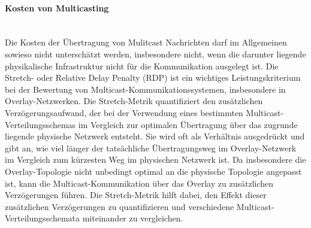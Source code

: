 \documentclass[../vs-script-first-v01.tex]{subfiles}
\begin{document}
\paragraph{Kosten von Multicasting}\mbox{}\\
Die Kosten der Übertragung von Mulitcast Nachrichten darf im Allgemeinen sowieso nicht unterschätzt werden, insbesondere nicht, wenn die darunter liegende physikalische Infrastruktur nicht für die Kommunikation ausgelegt ist. Die Stretch- oder Relative Delay Penalty (RDP) ist ein wichtiges Leistungskriterium bei der Bewertung von Multicast-Kommunikationssystemen, insbesondere in Overlay-Netzwerken. Die Stretch-Metrik quantifiziert den zusätzlichen Verzögerungsaufwand, der bei der Verwendung eines bestimmten Multicast-Verteilungsschemas im Vergleich zur optimalen Übertragung über das zugrunde liegende physische Netzwerk entsteht. Sie wird oft als Verhältnis ausgedrückt und gibt an, wie viel länger der tatsächliche Übertragungsweg im Overlay-Netzwerk im Vergleich zum kürzesten Weg im physischen Netzwerk ist. Da insbesondere die Overlay-Topologie nicht unbedingt optimal an die physische Topologie angepasst ist, kann die Multicast-Kommunikation über das Overlay zu zusätzlichen Verzögerungen führen. Die Stretch-Metrik hilft dabei, den Effekt dieser zusätzlichen Verzögerungen zu quantifizieren und verschiedene Multicast-Verteilungsschemata miteinander zu vergleichen.
\end{document}
